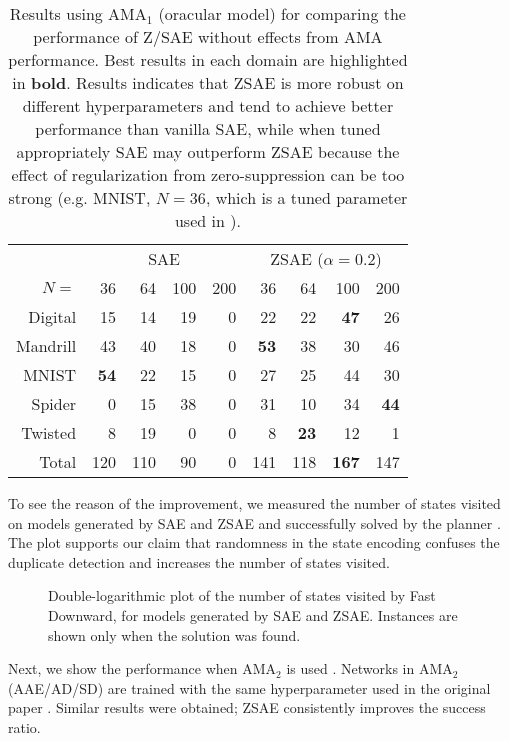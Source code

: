 \begin{table}[htbp]
\centering
{}
\begin{tabular}{|r|rrrr|rrrr|}
 & \multicolumn{4}{c|}{SAE} & \multicolumn{4}{c|}{ZSAE ($\alpha=0.2$)} \\ 
$N=$ & {36} & {64} & {100} & {200} & {36} & {64} & {100} & {200} \\ \hline
Digital & 15 & 14 & 19 & 0 & 22 & 22 & \textbf{47} & 26 \\
Mandrill & 43 & 40 & 18 & 0 & \textbf{53} & 38 & 30 & 46 \\
MNIST & \textbf{54} & 22 & 15 & 0 & 27 & 25 & 44 & 30 \\
Spider & 0 & 15 & 38 & 0 & 31 & 10 & 34 & \textbf{44} \\
Twisted & 8 & 19 & 0 & 0 & 8 & \textbf{23} & 12 & 1 \\ \hline
Total & {120} & {110} & {90} & {0} & {141} & {118} & \textbf{167} & {147} \\
\end{tabular}
\caption{Results using AMA$_1$ (oracular model) for comparing the performance of Z/SAE without effects from AMA performance.
Best results in each domain are highlighted in \textbf{bold}.
Results indicates that ZSAE is more robust on different hyperparameters and tend to achieve better performance than vanilla SAE,
while when tuned appropriately SAE may outperform ZSAE because the effect of regularization from zero-suppression can be too strong
(e.g. MNIST, $N=36$, which is a tuned parameter used in \cite{Asai2018}).
}
\label{tab:ama1}
\end{table}

To see the reason of the improvement, we measured the number of states
visited on models generated by SAE and ZSAE and successfully solved by
the planner . The plot supports our claim that
randomness in the state encoding confuses the duplicate detection and
increases the number of states visited.

\begin{figure}[htb]
 \vspace{2in}
 \caption{Double-logarithmic plot of the number of states visited by Fast Downward,
for models generated by SAE and ZSAE. Instances are shown only when the solution was found.}
 \label{fig:ama1-visted}
\end{figure}


Next, we show the performance when AMA$_2$ is used
. Networks in AMA$_2$ (AAE/AD/SD) are trained with the same hyperparameter 
used in the original paper \cite{Asai2018}.
Similar results were obtained; ZSAE consistently improves the success ratio.

